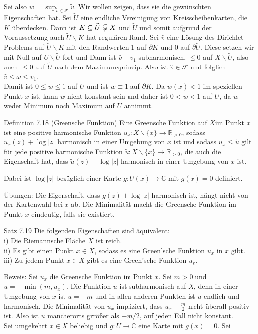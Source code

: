 \documentclass[10pt, letterpaper]{article}
\begin{document}
Sei also $w=\sup _{\widetilde{v} \in \mathcal{F}} \widetilde{v}$. Wir wollen zeigen, dass sie die gewünschten Eigenschaften hat. Sei $\widetilde{U}$ eine endliche Vereinigung von Kreisscheibenkarten, die $K$ überdecken. Dann ist $K \subseteq \widetilde{U} \varsubsetneqq X$ und $\widetilde{U}$ und somit aufgrund der Voraussetzung auch $\widetilde{U} \backslash K$ hat regulären Rand. Sei $\widehat{v}$ eine Lösung des Dirichlet-Problems auf $\widetilde{U} \backslash K$ mit den Randwerten 1 auf $\partial K$ und 0 auf $\partial \widetilde{U}$. Diese setzen wir mit Null auf $\bar{U} \backslash \widetilde{U}$ fort und Dann ist $\widehat{v}-v_{1}$ subharmonisch, $\leq 0$ auf $X \backslash \widetilde{U}$, also auch $\leq 0$ auf $\widetilde{U}$ nach dem Maximumsprinzip. Also ist $\widehat{v} \in \mathcal{F}$ und folglich $\widehat{v} \leq \omega \leq v_{1}$.\\
Damit ist $0 \leq w \leq 1$ auf $\bar{U}$ und ist $w \equiv 1$ auf $\partial K$. Da $w(x)<1$ im speziellen Punkt $x$ ist, kann $w$ nicht konstant sein und daher ist $0<w<1$ auf $U$, da $w$ weder Minimum noch Maximum auf $U$ annimmt.

Definition 7.18 (Greensche Funktion) Eine Greensche Funktion auf $X \mathrm{im}$ Punkt $x$ ist eine positive harmonische Funktion $u_{x}: X \backslash\{x\} \rightarrow \mathbb{R}_{>0}$, sodass $u_{x}(z)+\log |z|$ harmonisch in einer Umgebung von $x$ ist und sodass $u_{x} \leq \widetilde{u}$ gilt für jede positive harmonische Funktion $\widetilde{u}: X \backslash\{x\} \rightarrow \mathbb{R}_{>0}$, die auch die Eigenschaft hat, dass $\widetilde{u}(z)+\log |z|$ harmonisch in einer Umgebung von $x$ ist.

Dabei ist $\log |z|$ bezüglich einer Karte $g: U(x) \rightarrow \mathbb{C}$ mit $g(x)=0$ definiert.

Übungen: Die Eigenschaft, dass $g(z)+\log |z|$ harmonisch ist, hängt nicht von der Kartenwahl bei $x$ ab. Die Minimalität macht die Greensche Funktion im Punkt $x$ eindeutig, falls sie existiert.

Satz 7.19 Die folgenden Eigenschaften sind äquivalent:\\
i) Die Riemannsche Fläche $X$ ist reich.\\
ii) Es gibt einen Punkt $x \in X$, sodass es eine Green'sche Funktion $u_{x}$ in $x$ gibt.\\
iii) Zu jedem Punkt $x \in X$ gibt es eine Green'sche Funktion $u_{x}$.

Beweis: Sei $u_{x}$ die Greensche Funktion im Punkt $x$. Sei $m>0$ und $u=-\min \left(m, u_{x}\right)$. Die Funktion $u$ ist subharmonisch auf $X$, denn in einer Umgebung von $x$ ist $u=-m$ und in allen anderen Punkten ist $u$ endlich und harmonisch. Die Minimalität von $u_{x}$ impliziert, dass $u_{x}-\frac{m}{2}$ nicht überall positiv ist. Also ist $u$ mancherorts grrößer als $-m / 2$, auf jeden Fall nicht konstant.\\
Sei umgekehrt $x \in X$ beliebig und $g: U \rightarrow \mathbb{C}$ eine Karte mit $g(x)=0$. Sei
\end{document}
